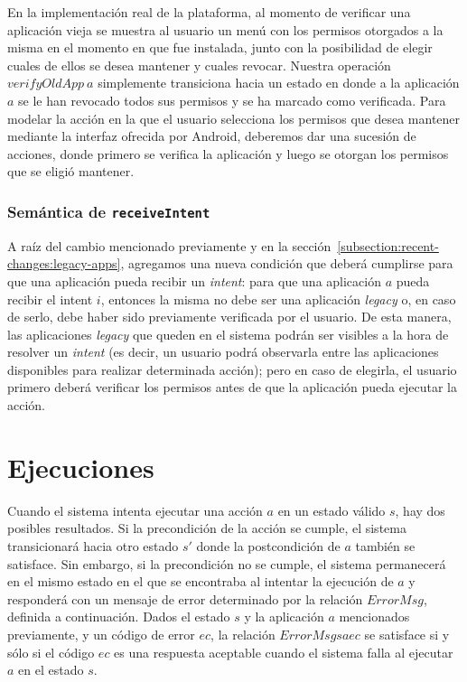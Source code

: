En la implementación real de la plataforma, al momento de verificar una aplicación vieja se muestra
al usuario un menú con los permisos otorgados a la misma en el momento en que fue instalada, junto
con la posibilidad de elegir cuales de ellos se desea mantener y cuales revocar. Nuestra operación
$verifyOldApp\ a$ simplemente transiciona hacia un estado en donde a la aplicación $a$ se le han
revocado todos sus permisos y se ha marcado como verificada. Para modelar la acción en la que el
usuario selecciona los permisos que desea mantener mediante la interfaz ofrecida por Android,
deberemos dar una sucesión de acciones,  donde primero se verifica la aplicación y luego se otorgan
los permisos que se eligió mantener.

\subsubsection{Semántica de \texttt{receiveIntent}}

A raíz del cambio mencionado previamente y en la
sección~\ref{subsection:recent-changes:legacy-apps}, agregamos una nueva condición que deberá
cumplirse para que una aplicación pueda recibir un \textit{intent}: para que una aplicación $a$
pueda recibir el intent $i$, entonces la misma no debe ser una aplicación \textit{legacy} o, en caso
de serlo, debe haber sido previamente verificada por el usuario. De esta manera, las aplicaciones
\textit{legacy} que queden en el sistema podrán ser visibles a la hora de resolver un
\textit{intent} (es decir, un usuario podrá observarla entre las aplicaciones disponibles para
realizar determinada acción); pero en caso de elegirla, el usuario primero deberá verificar los
permisos antes de que la aplicación pueda ejecutar la acción.


\section{Ejecuciones}
Cuando el sistema intenta ejecutar una acción $a$ en un estado válido $s$, hay dos posibles
resultados. Si la precondición de la acción se cumple, el sistema transicionará hacia otro estado
$s'$ donde la postcondición de $a$ también se satisface. Sin embargo, si la precondición no se
cumple, el sistema permanecerá en el mismo estado en el que se encontraba al intentar la ejecución
de $a$ y responderá con un mensaje de error determinado por la relación $ErrorMsg$, definida a
continuación. Dados el estado $s$ y la aplicación $a$ mencionados previamente, y un código de error
$ec$, la relación $ErrorMsg s a ec$ se satisface si y sólo si el código $ec$ es una respuesta
aceptable cuando el sistema falla al ejecutar $a$ en el estado $s$.

